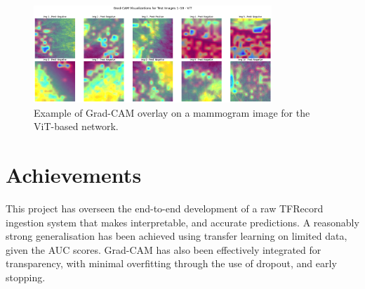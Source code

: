 \documentclass[../main]{subfiles}
\begin{document}
\begin{figure}[h!]
    \centering
    \includegraphics[width=0.8\textwidth]{assets/grad_cam_vit.png}
    \caption{Example of Grad-CAM overlay on a mammogram image for the ViT-based network.}
    \label{fig:grad-cam-vit}
\end{figure}

\clearpage

\section{Achievements}
This project has overseen the end-to-end development of a raw TFRecord ingestion system that makes interpretable, and accurate predictions. A reasonably strong generalisation has been achieved using transfer learning on limited data, given the AUC scores. Grad-CAM has also been effectively integrated for transparency, with minimal overfitting through the use of dropout, and early stopping.
\end{document}
